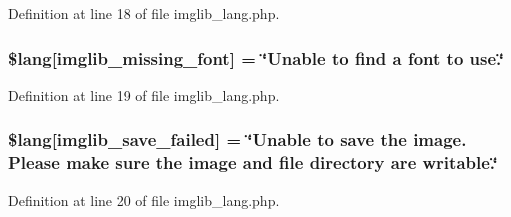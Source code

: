 Definition at line 18 of file imglib\+\_\+lang.\+php.

\subsubsection[{\texorpdfstring{\$lang}{$lang}}]{\setlength{\rightskip}{0pt plus 5cm}\$lang\mbox{[}\textquotesingle{}imglib\+\_\+missing\+\_\+font\textquotesingle{}\mbox{]} = \char`\"{}Unable to find {\bf a} font to use.\char`\"{}}\hypertarget{system_2language_2english_2imglib__lang_8php_a935800aad2be18ca4fe99bb074674848}{}\label{system_2language_2english_2imglib__lang_8php_a935800aad2be18ca4fe99bb074674848}


Definition at line 19 of file imglib\+\_\+lang.\+php.

\subsubsection[{\texorpdfstring{\$lang}{$lang}}]{\setlength{\rightskip}{0pt plus 5cm}\$lang\mbox{[}\textquotesingle{}imglib\+\_\+save\+\_\+failed\textquotesingle{}\mbox{]} = \char`\"{}Unable to save the image. Please make sure the image and file directory are writable.\char`\"{}}\hypertarget{system_2language_2english_2imglib__lang_8php_a4d7a99fddc60c97a7327fa0125dea264}{}\label{system_2language_2english_2imglib__lang_8php_a4d7a99fddc60c97a7327fa0125dea264}


Definition at line 20 of file imglib\+\_\+lang.\+php.

